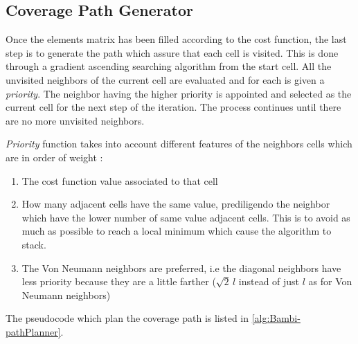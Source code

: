 \subsection{Coverage Path Generator} %
\label{sub:coverage_path_generator}
Once the elements matrix has been filled according to the cost function, the last step is to generate the path which assure that each cell is visited. This is done through a gradient ascending searching algorithm from the start cell. All the unvisited neighbors of the current cell are evaluated and for each is given a \textit{priority}. The neighbor having the higher priority is appointed and selected as the current cell for the next step of the iteration. The process continues until there are no more unvisited neighbors.\par
\textit{Priority} function takes into account different features of the neighbors cells which are in order of weight :
\begin{enumerate}
	\item The cost function value associated to that cell
	\item How many adjacent cells have the same value, prediligendo the neighbor which have the lower number of same value adjacent cells. This is to avoid as much as possible to reach a local minimum which cause the algorithm to stack.
	\item The Von Neumann neighbors are preferred, i.e the diagonal neighbors have less priority because they are a little farther ($\sqrt{2}\,l$ instead of just $l$ as for Von Neumann neighbors)
\end{enumerate}
The pseudocode which plan the coverage path is listed in \autoref{alg:Bambi-pathPlanner}.\\
